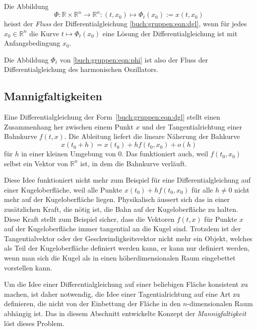\begin{definition}
Die Abbildung
\[
\Phi\colon \mathbb{R}\times\mathbb{R}^n\to\mathbb{R}^n
:
(t,x_0) \mapsto \Phi_t(x_0) := x(t,x_0)
\]
heisst der {\em Fluss} der Differentialgleichung
%
\eqref{buch:gruppen:eqn:dgl},
wenn für jedes $x_0\in\mathbb{R}^n$ die Kurve $t\mapsto \Phi_t(x_0)$
eine Lösung der Differentialgleichung ist mit Anfangsbedingung $x_0$.
\end{definition}

Die Abbildung $\Phi_t$ von \eqref{buch:gruppen:eqn:phi} ist also
der Fluss der Differentialgleichung des harmonischen Oszillators.

\subsection{Mannigfaltigkeiten
\label{buch:subsection:mannigfaltigkeit}}
Eine Differentialgleichung der Form~\eqref{buch:gruppen:eqn:dgl}
stellt einen Zusammenhang her zwischen einem Punkt $x$ und der
Tangentialrichtung einer Bahnkurve $f(t,x)$.
Die Ableitung liefert die lineare Näherung der Bahkurve
\[
x(t_0+h) = x(t_0) + h f(t_0,x_0) + o(h)
\]
für $h$ in einer kleinen Umgebung von $0$.
Das funktioniert auch, weil $f(t_0,x_0)$ selbst ein Vektor von
$\mathbb{R}^n$ ist, in dem die Bahnkurve verläuft.

Diese Idee funktioniert nicht mehr zum Beispiel für eine
Differentialgleichung auf einer Kugel\-oberfläche, weil alle Punkte
$x(t_0)+hf(t_0,x_0)$ für alle $h\ne 0$ nicht mehr auf der Kugeloberfläche
liegen.
Physikalisch äussert sich das in einer zusätzlichen Kraft, die nötig
ist, die Bahn auf der Kugeloberfläche zu halten.
Diese Kraft stellt zum Beispiel sicher, dass die Vektoren $f(t,x)$ für
Punkte $x$ auf der Kugeloberfläche immer tangential an die Kugel sind.
Trotzdem ist der Tangentialvektor oder der Geschwindigkeitsvektor 
nicht mehr ein Objekt, welches als Teil der Kugeloberfläche definiert
werden kann, er kann nur definiert werden, wenn man sich die Kugel als
in einen höherdimensionalen Raum eingebettet vorstellen kann.

Um die Idee einer Differentialgleichung auf einer beliebigen Fläche
konsistent zu machen, ist daher notwendig, die Idee einer Tagentialrichtung
auf eine Art zu definieren, die nicht von der Einbettung der Fläche
in den $n$-dimensionalen Raum abhängig ist.
Das in diesem Abschnitt entwickelte Konzept der {\em Mannigfaltigkeit}
löst dieses Problem.
%

